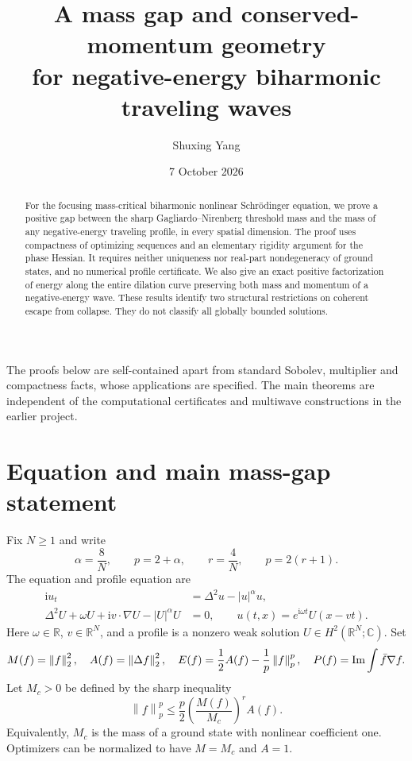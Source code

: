 \documentclass[11pt,a4paper]{article}
\title{A mass gap and conserved-momentum geometry\\for negative-energy biharmonic traveling waves}
\author{Shuxing Yang}
\date{7 October 2026}
\theoremstyle{remark}\newtheorem{remark}[theorem]{Remark}
\newcommand{\R}{\mathbb R}\newcommand{\C}{\mathbb C}
\newcommand{\ii}{\mathrm i}\newcommand{\dd}{\,\mathrm d}
\newcommand{\norm}[1]{\left\|#1\right\|}
\begin{document}
\maketitle
\begin{abstract}
For the focusing mass-critical biharmonic nonlinear Schr\"odinger equation, we prove a positive gap between the sharp Gagliardo--Nirenberg threshold mass and the mass of any negative-energy traveling profile, in every spatial dimension. The proof uses compactness of optimizing sequences and an elementary rigidity argument for the phase Hessian. It requires neither uniqueness nor real-part nondegeneracy of ground states, and no numerical profile certificate. We also give an exact positive factorization of energy along the entire dilation curve preserving both mass and momentum of a negative-energy wave. These results identify two structural restrictions on coherent escape from collapse. They do not classify all globally bounded solutions.
\end{abstract}
The proofs below are self-contained apart from standard Sobolev, multiplier and compactness facts, whose applications are specified. The main theorems are independent of the computational certificates and multiwave constructions in the earlier project.

\section{Equation and main mass-gap statement}
Fix $N\ge1$ and write
\[
 \alpha=\frac8N,\qquad p=2+\alpha,\qquad r=\frac4N,
 \qquad p=2(r+1).
\]
The equation and profile equation are
\begin{align}
 \ii u_t&=\Delta^2u-|u|^\alpha u,\label{eq:pde}\\
 \Delta^2U+\omega U+\ii v\cdot\nabla U-|U|^\alpha U&=0,
 \qquad u(t,x)=e^{\ii\omega t}U(x-vt).\label{eq:profile}
\end{align}
Here $\omega\in\R$, $v\in\R^N$, and a profile is a nonzero weak solution $U\in H^2(\R^N;\C)$. Set
\[
 M(f)=\norm f_2^2,\quad A(f)=\norm{\Delta f}_2^2,\quad
 E(f)=\frac12 A(f)-\frac1p\norm f_p^p,\quad
 P(f)=\Ima\int\bar f\nabla f.
\]
Let $M_c>0$ be defined by the sharp inequality
\begin{equation}\label{eq:gn}
 \norm f_p^p\le\frac p2\left(\frac{M(f)}{M_c}\right)^r A(f).
\end{equation}
Equivalently, $M_c$ is the mass of a ground state with nonlinear coefficient one. Optimizers can be normalized to have $M=M_c$ and $A=1$.
\end{document}
